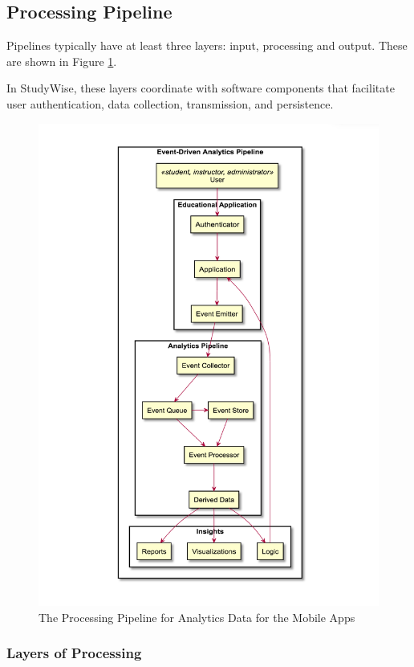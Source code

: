 \documentclass[runningheads,a4paper]{llncs}
\begin{document}
\subsection{Processing Pipeline}

Pipelines typically have at least three layers: input, processing and output.  These are shown in Figure \ref{fig:Pipeline}.

In StudyWise, these layers coordinate with software components that facilitate user authentication, data collection, transmission, and persistence. 

\begin{figure}
\centering
\includegraphics{AnalyticsPipeline}
\caption{The Processing Pipeline for Analytics Data for the Mobile Apps}
\label{fig:Pipeline}
\end{figure}

\subsubsection{Layers of Processing}
\end{document}
